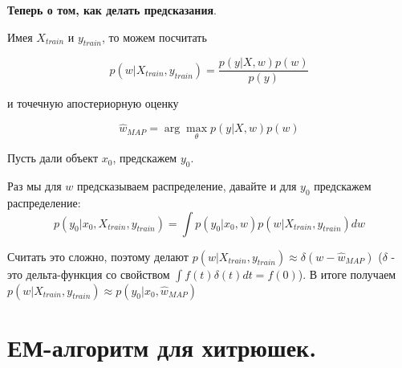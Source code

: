 \documentclass[12pt]{article}
\begin{document}
\begin{itemize}
    \textbf{Теперь о том, как делать предсказания}.

    Имея $X_{train}$ и $y_{train}$, то можем посчитать 

    \[  p(w|X_{train}, y_{train}) = \frac{p(y|X,w)p(w)}{p(y)} \]

    и точечную апостериорную оценку

    \[ \hat{w}_{MAP} = \arg \max_{\theta} p(y|X, w) p(w) \]

    Пусть дали объект $x_0$, предскажем $y_0$.

    Раз мы для $w$ предсказываем распределение, давайте и для $y_0$ предскажем распределение:
    \[ p(y_0|x_0, X_{train}, y_{train}) = \int p(y_0|x_0, w) p(w|X_{train}, y_{train}) dw\]

    Считать это сложно, поэтому делают $p(w|X_{train}, y_{train}) \approx \delta(w - \hat{w}_{MAP})$ ($\delta$ - это дельта-функция со свойством $\int f(t) \delta(t) dt = f(0)$). В итоге получаем $p(w|X_{train}, y_{train}) \approx p(y_0|x_0, \hat{w}_{MAP})$

\end{itemize}




\section*{ЕМ-алгоритм для хитрюшек.}
\end{document}
